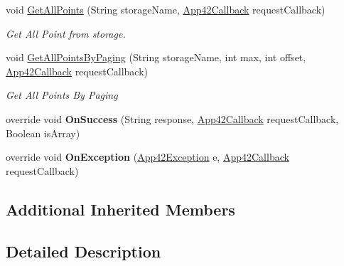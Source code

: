 \begin{DoxyCompactItemize}
void \hyperlink{classcom_1_1shephertz_1_1app42_1_1paas_1_1sdk_1_1windows_1_1geo_1_1_geo_service_af18539c91640d740650aa585563365d6}{Get\+All\+Points} (String storage\+Name, \hyperlink{interfacecom_1_1shephertz_1_1app42_1_1paas_1_1sdk_1_1windows_1_1_app42_callback}{App42\+Callback} request\+Callback)
\begin{DoxyCompactList}\small\item\em Get All Point from storage. \end{DoxyCompactList}\item 
void \hyperlink{classcom_1_1shephertz_1_1app42_1_1paas_1_1sdk_1_1windows_1_1geo_1_1_geo_service_a673e444e60f9163e55d31b6c23d138f0}{Get\+All\+Points\+By\+Paging} (String storage\+Name, int max, int offset, \hyperlink{interfacecom_1_1shephertz_1_1app42_1_1paas_1_1sdk_1_1windows_1_1_app42_callback}{App42\+Callback} request\+Callback)
\begin{DoxyCompactList}\small\item\em Get All Points By Paging \end{DoxyCompactList}\item 
\hypertarget{classcom_1_1shephertz_1_1app42_1_1paas_1_1sdk_1_1windows_1_1geo_1_1_geo_service_a04eac37bb4f4bc0b4f099d423d9594e0}{override void {\bfseries On\+Success} (String response, \hyperlink{interfacecom_1_1shephertz_1_1app42_1_1paas_1_1sdk_1_1windows_1_1_app42_callback}{App42\+Callback} request\+Callback, Boolean is\+Array)}\label{classcom_1_1shephertz_1_1app42_1_1paas_1_1sdk_1_1windows_1_1geo_1_1_geo_service_a04eac37bb4f4bc0b4f099d423d9594e0}

\item 
\hypertarget{classcom_1_1shephertz_1_1app42_1_1paas_1_1sdk_1_1windows_1_1geo_1_1_geo_service_a1d09d875477b669ebb21dabb8be81a29}{override void {\bfseries On\+Exception} (\hyperlink{classcom_1_1shephertz_1_1app42_1_1paas_1_1sdk_1_1windows_1_1_app42_exception}{App42\+Exception} e, \hyperlink{interfacecom_1_1shephertz_1_1app42_1_1paas_1_1sdk_1_1windows_1_1_app42_callback}{App42\+Callback} request\+Callback)}\label{classcom_1_1shephertz_1_1app42_1_1paas_1_1sdk_1_1windows_1_1geo_1_1_geo_service_a1d09d875477b669ebb21dabb8be81a29}

\end{DoxyCompactItemize}
\subsection*{Additional Inherited Members}


\subsection{Detailed Description}


